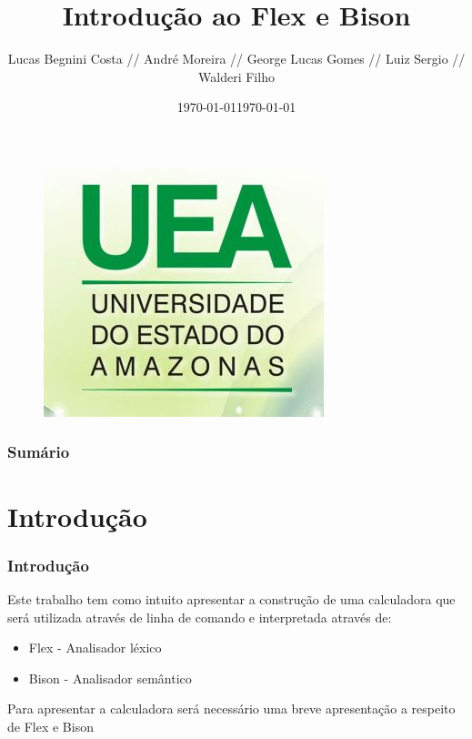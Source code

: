 \documentclass{beamer}
\title[Introdução ao Flex e Bison]{Introdução ao Flex e Bison}
\author[Lucas, André, George, Luis, Walderi]
       {Lucas Begnini Costa // André Moreira // George Lucas Gomes // Luiz Sergio // Walderi Filho}
\institute[UEA]{Universidade do Estado do Amazonas}
\date{\today}
\begin{document}

\begin{frame}[plain] %
    \titlepage   	%
	
            \begin{figure} 	%
            \centering		%
            \includegraphics[scale=0.41]{simbolouea} %
            \end{figure}
	\date{\today}  		%
\end{frame}			%

\frame{\titlepage}



\begin{frame}
  \frametitle{Sumário}		%
  \tableofcontents		%
\end{frame}			%


\section{Introdução}		%
\begin{frame} 			%
\frametitle{Introdução}
  Este trabalho tem como intuito apresentar a construção de uma calculadora	%
 que será utilizada através de linha de comando e interpretada através de:	%
 
    \begin{itemize} 				%
     \item<1-> Flex - Analisador léxico    	%
     \item<2-> Bison - Analisador semântico	 %
    \end{itemize}				%
  Para apresentar a calculadora será necessário uma breve apresentação a respeito de
 Flex e Bison

\end{frame}			%
\end{document}
